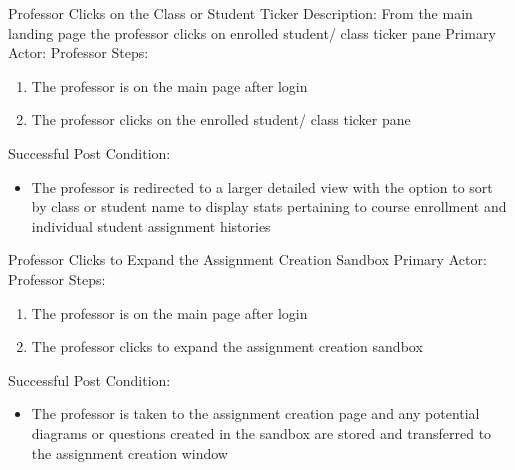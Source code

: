     \begin{section}{Professor Clicks on the Class or Student Ticker}
        Description: From the main landing page the professor clicks on enrolled student/ class ticker pane \newline
        Primary Actor: Professor \newline
        Steps:
        \begin{enumerate}
            \item{The professor is on the main page after login}
            \item{The professor clicks on the enrolled student/ class ticker pane}
        \end{enumerate}
        Successful Post Condition:
        \begin{itemize}
            \item The professor is redirected to a larger detailed view with the option to sort by class or student name to display stats pertaining to course enrollment and individual student assignment histories
        \end{itemize}
    \end{section}
    
    \begin{section}{Professor Clicks to Expand the Assignment Creation Sandbox}
        Primary Actor: Professor \newline
        Steps:
        \begin{enumerate}
        \item{The professor is on the main page after login} 
        \item{The professor clicks to expand the assignment creation sandbox}
        \end{enumerate}
        Successful Post Condition:
        \begin{itemize}
        \item{The professor is taken to the assignment creation page and any potential diagrams or questions created in the sandbox are stored and transferred to the assignment creation window}
        \end{itemize}
    \end{section}
    
    \newpage
    
